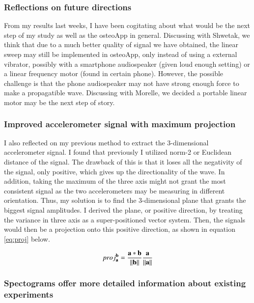 \documentclass{sigchi}
\begin{document}
\subsubsection{Reflections on future directions} 

From my results last weeks, I have been cogitating about what would be the next step of my study as well as the osteoApp in general. Discussing with Shwetak, we think that due to a much better quality of signal we have obtained, the linear sweep may still be implemented in osteoApp, only instead of using a external vibrator, possibly with a smartphone audiospeaker (given loud enough setting) or a linear frequency motor (found in certain phone). However, the possible challenge is that the phone audiospeaker may not have strong enough force to make a propagatible wave. Discussing with Morelle, we decided a portable linear motor may be the next step of story.

\subsubsection{Improved accelerometer signal with maximum projection} 

I also reflected on my previous method to extract the 3-dimensional accelerometer signal. I found that previously I utilized norm-2 or Euclidean distance of the signal. The drawback of this is that it loses all the negativity of the signal, only positive, which gives up the directionality of the wave. In addition, taking the maximum of the three axis might not grant the most consistent signal as the two accelerometers may be measuring in different orientation. Thus, my solution is to find the 3-dimensional plane that grants the biggest signal amplitudes. I derived the plane, or positive direction, by treating the variance in three axis as a super-positioned vector system. Then, the signals would then be a projection onto this positive direction, as shown in equation \eqref{eq:proj} below.

\begin{equation} \label{eq:proj}
proj_{\bf a}^{\bf b}=\frac{\bf a *\bf b}{\|\bf b\|}\frac{\bf a}{\|\bf a\|}
\end{equation}

\subsubsection{Spectograms offer more detailed information about existing experiments} 
\end{document}
